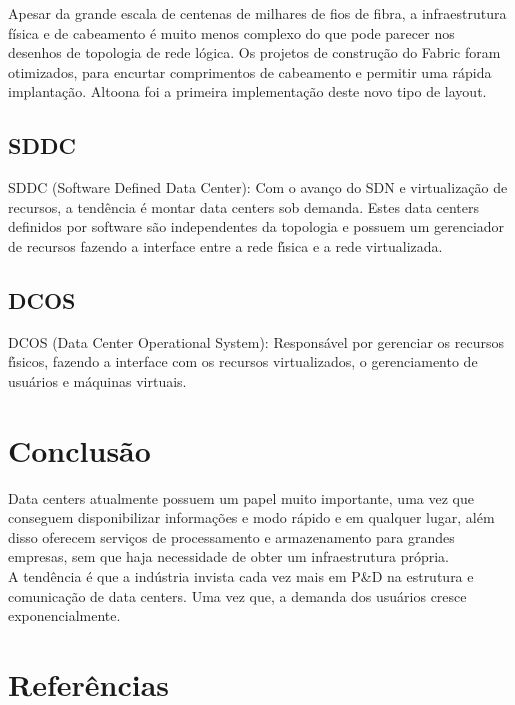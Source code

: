 \documentclass[12pt,a4paper]{report}
\begin{document}
Apesar da grande escala de centenas de milhares de fios de fibra, a infraestrutura física 
e de cabeamento é muito menos complexo do que pode parecer nos desenhos de topologia de rede lógica. 
Os projetos de construção do Fabric foram otimizados, para encurtar comprimentos de cabeamento 
e permitir uma rápida implantação. Altoona foi a primeira implementação deste novo tipo de layout.

\section{SDDC}

SDDC (Software Defined Data Center): Com o avanço do SDN e virtualização de recursos, a
tendência é montar data centers sob demanda. Estes data centers definidos por software são
independentes da topologia e possuem um gerenciador de recursos fazendo a interface entre a
rede fı́sica e a rede virtualizada.\\

\section{DCOS}

DCOS (Data Center Operational System): Responsável por gerenciar os recursos fı́sicos,
fazendo a interface com os recursos virtualizados, o gerenciamento de usuários e máquinas
virtuais.

\chapter{Conclusão}

Data centers atualmente possuem um papel muito importante, uma vez que conseguem disponibilizar informações e modo rápido e em qualquer lugar, além disso oferecem serviços de processamento e armazenamento para grandes empresas, sem que haja necessidade de obter um infraestrutura própria.\\

A tendência é que a indústria invista cada vez mais em P&D na estrutura e comunicação de data centers. Uma vez que, a demanda dos usuários cresce exponencialmente.\\

\chapter{Referências}
\end{document}
